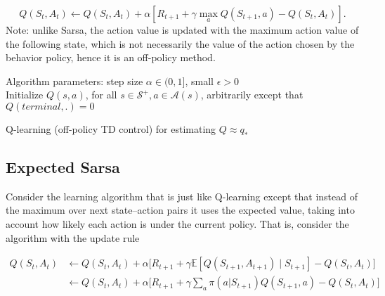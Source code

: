 \documentclass[11pt]{article}
\begin{document}
\begin{equation}
Q(S_t, A_t) \leftarrow Q(S_t, A_t) + \alpha [R_{t+1} + \gamma \max_{a} Q(S_{t+1}, a) - Q(S_t, A_t)].
\end{equation}
Note: unlike Sarsa, the action value is updated with the maximum action value of
the following state, which is not necessarily the value of the action chosen by
the behavior policy, hence it is an off-policy method.
\newline
\newline
\begin{algorithm}[H]
Algorithm parameters: step size $\alpha \in (0,1]$, small $\epsilon > 0$ \\
Initialize $Q(s,a)$, for all $s \in \mathcal{S}^+, a \in \mathcal{A}(s)$, arbitrarily except that $Q(terminal, .) = 0$ \\

\;
\;
\caption{Q-learning (off-policy TD control) for estimating $Q \approx q_*$}
\end{algorithm}

\subsection{Expected Sarsa}
\label{sec:org8a00ca1}

Consider the learning algorithm that is just like Q-learning except that instead
of the maximum over next state–action pairs it uses the expected value, taking
into account how likely each action is under the current policy. That is,
consider the algorithm with the update rule

\begin{equation}
\begin{aligned}
Q(S_t, A_t) & \leftarrow Q(S_t, A_t) + \alpha \big[ R_{t+1} + \gamma \mathbb{E}[Q(S_{t+1}, A_{t+1}) \mid S_{t+1}] - Q(S_t, A_t)\big] \\
            & \leftarrow Q(S_t, A_t) + \alpha \big[ R_{t+1} + \gamma \sum\limits_{a} \pi(a|S_{t+1}) Q(S_{t+1}, a) - Q(S_t, A_t)\big]
\end{aligned}
\end{equation}
\end{document}
